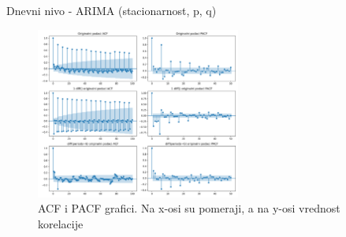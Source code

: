 \documentclass{beamer}
\begin{document}
\begin{frame}{Dnevni nivo - ARIMA (stacionarnost, p, q)}
 \begin{figure}[!ht]
    \centering
    \includegraphics[width=0.6\textwidth]{./images/grafici/acf_pacf_dnevni.png}
    \vspace{-5px}
    \caption{ACF i PACF grafici. Na x-osi su pomeraji, a na y-osi vrednost korelacije}
    \label{fig: acf_pacf_dnevni}
\end{figure}
\end{frame}
\end{document}
